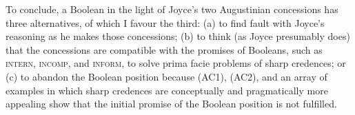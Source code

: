 \documentclass[12pt]{article}
\begin{document}
To conclude, a Boolean in the light of Joyce's two Augustinian
concessions has three alternatives, of which I favour the third: (a)
to find fault with Joyce's reasoning as he makes those concessions;
(b) to think (as Joyce presumably does) that the concessions are
compatible with the promises of Booleans, such as \textsc{intern},
\textsc{incomp}, and \textsc{inform}, to solve prima facie problems of
sharp credences; or (c) to abandon the Boolean position because (AC1),
(AC2), and an array of examples in which sharp credences are
conceptually and pragmatically more appealing show that the initial
promise of the Boolean position is not fulfilled.

\newpage

 

\end{document}
